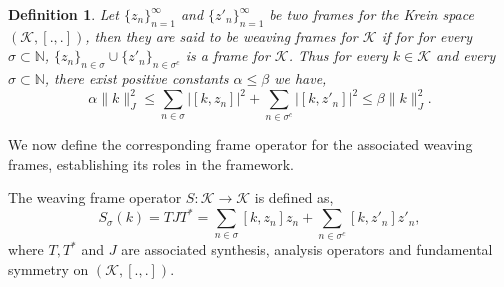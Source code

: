 \documentclass[article,12pt]{amsart}
\newtheorem{defn}[thm]{Definition}
\begin{document}
\begin{defn}
Let $\{z_n\}_{n=1}^\infty$ and $\{z'_n\}_{n=1}^\infty$ be two frames for the Krein space $(\mathcal K, [.,.])$, then they are said to be weaving frames for $\mathcal K$ if for for every $\sigma \subset \mathbb N$, $\{z_n\}_{n \in \sigma} \cup \{z'_n\}_{n \in \sigma^c}$ is a frame for $\mathcal K$. Thus for every $k \in \mathcal K$ and every $\sigma \subset \mathbb N$, there exist positive constants $\alpha \leq \beta$ we have,
\begin{equation}\label{1}
\alpha \|k\|_{J}^2 \leq \sum\limits_{n \in \sigma} |[k, z_n]|^2 + \sum\limits_{n \in \sigma^c} |[k, z'_n]|^2 \leq \beta \|k\|_{J}^2.
\end{equation}
\end{defn}

We now define the corresponding  frame operator for the associated weaving frames, establishing its roles in the framework.

The weaving frame operator $S:\mathcal K \rightarrow \mathcal K$ is defined as, 
$$S_{\sigma}(k)=TJT^*=\sum\limits_{n \in \sigma} [k, z_n] z_n + \sum\limits_{n \in \sigma^c} [k, z'_n] z'_n,$$ where $T, T^*$ and $J$ are associated synthesis, analysis operators and fundamental symmetry on $(\mathcal K, [.,.])$.
\end{document}
